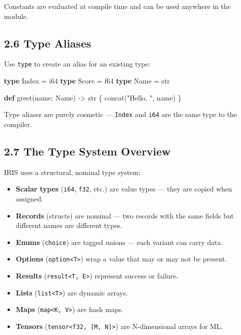 \documentclass[
  english,
]{book}
\newenvironment{Shaded}{\begin{snugshade}}{\end{snugshade}}
\newcommand{\DataTypeTok}[1]{\textcolor[rgb]{0.31,0.79,0.69}{#1}}
\newcommand{\FunctionTok}[1]{\textcolor[rgb]{0.86,0.86,0.67}{#1}}
\newcommand{\KeywordTok}[1]{\textcolor[rgb]{0.34,0.61,0.84}{\textbf{#1}}}
\newcommand{\NormalTok}[1]{\textcolor[rgb]{0.83,0.83,0.83}{#1}}
\newcommand{\OperatorTok}[1]{\textcolor[rgb]{0.83,0.83,0.83}{#1}}
\newcommand{\StringTok}[1]{\textcolor[rgb]{0.81,0.57,0.47}{#1}}
\providecommand{\tightlist}{%
  \setlength{\itemsep}{0pt}\setlength{\parskip}{0pt}}
\begin{document}
Constants are evaluated at compile time and can be used anywhere in the
module.

\subsection{2.6 Type Aliases}\label{type-aliases}

Use \texttt{type} to create an alias for an existing type:

\begin{Shaded}
\begin{Highlighting}[]
\KeywordTok{type}\NormalTok{ Index }\OperatorTok{=} \DataTypeTok{i64}
\KeywordTok{type}\NormalTok{ Score }\OperatorTok{=} \DataTypeTok{f64}
\KeywordTok{type}\NormalTok{ Name }\OperatorTok{=} \DataTypeTok{str}

\KeywordTok{def}\NormalTok{ greet(name: Name) }\OperatorTok{{-}\textgreater{}} \DataTypeTok{str}\NormalTok{ \{}
    \FunctionTok{concat}\NormalTok{(}\StringTok{"Hello, "}\NormalTok{, name)}
\NormalTok{\}}
\end{Highlighting}
\end{Shaded}

Type aliases are purely cosmetic --- \texttt{Index} and \texttt{i64} are
the same type to the compiler.

\subsection{2.7 The Type System
Overview}\label{the-type-system-overview}

IRIS uses a structural, nominal type system:

\begin{itemize}
\tightlist
\item
  \textbf{Scalar types} (\texttt{i64}, \texttt{f32}, etc.) are value
  types --- they are copied when assigned.
\item
  \textbf{Records} (structs) are nominal --- two records with the same
  fields but different names are different types.
\item
  \textbf{Enums} (\texttt{choice}) are tagged unions --- each variant
  can carry data.
\item
  \textbf{Options} (\texttt{option\textless{}T\textgreater{}}) wrap a
  value that may or may not be present.
\item
  \textbf{Results} (\texttt{result\textless{}T,\ E\textgreater{}})
  represent success or failure.
\item
  \textbf{Lists} (\texttt{list\textless{}T\textgreater{}}) are dynamic
  arrays.
\item
  \textbf{Maps} (\texttt{map\textless{}K,\ V\textgreater{}}) are hash
  maps.
\item
  \textbf{Tensors}
  (\texttt{tensor\textless{}f32,\ {[}M,\ N{]}\textgreater{}}) are
  N-dimensional arrays for ML.
\end{itemize}
\end{document}
